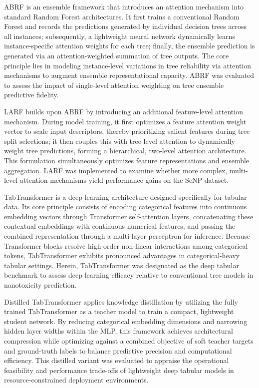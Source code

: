 \documentclass[letterpaper]{article}
\begin{document}
ABRF is an ensemble framework that introduces an attention mechanism into standard Random Forest architectures. It first trains a conventional Random Forest and records the predictions generated by individual decision trees across all instances; subsequently, a lightweight neural network dynamically learns instance-specific attention weights for each tree; finally, the ensemble prediction is generated via an attention-weighted summation of tree outputs. The core principle lies in modeling instance-level variations in tree reliability via attention mechanisms to augment ensemble representational capacity. ABRF was evaluated to assess the impact of single-level attention weighting on tree ensemble predictive fidelity.

LARF builds upon ABRF by introducing an additional feature-level attention mechanism. During model training, it first optimizes a feature attention weight vector to scale input descriptors, thereby prioritizing salient features during tree split selections; it then couples this with tree-level attention to dynamically weight tree predictions, forming a hierarchical, two-level attention architecture. This formulation simultaneously optimizes feature representations and ensemble aggregation. LARF was implemented to examine whether more complex, multi-level attention mechanisms yield performance gains on the SeNP dataset.

TabTransformer is a deep learning architecture designed specifically for tabular data. Its core principle consists of encoding categorical features into continuous embedding vectors through Transformer self-attention layers, concatenating these contextual embeddings with continuous numerical features, and passing the combined representation through a multi-layer perceptron for inference. Because Transformer blocks resolve high-order non-linear interactions among categorical tokens, TabTransformer exhibits pronounced advantages in categorical-heavy tabular settings. Herein, TabTransformer was designated as the deep tabular benchmark to assess deep learning efficacy relative to conventional tree models in nanotoxicity prediction.

Distilled TabTransformer applies knowledge distillation by utilizing the fully trained TabTransformer as a teacher model to train a compact, lightweight student network. By reducing categorical embedding dimensions and narrowing hidden layer widths within the MLP, this framework achieves architectural compression while optimizing against a combined objective of soft teacher targets and ground-truth labels to balance predictive precision and computational efficiency. This distilled variant was evaluated to appraise the operational feasibility and performance trade-offs of lightweight deep tabular models in resource-constrained deployment environments.
\end{document}
